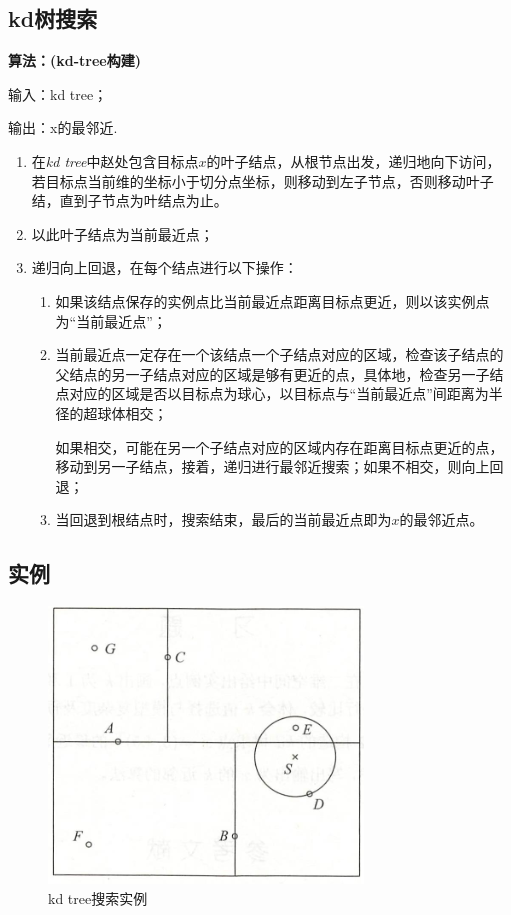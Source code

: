 \subsection*{kd树搜索}

\begin{framed}

    \textbf{算法：(kd-tree构建)}

    输入：kd tree；

    输出：x的最邻近.

    \begin{enumerate}[itemindent=2em]
        \item 在\textsl{kd tree}中赵处包含目标点$x$的叶子结点，从根节点出发，递归地向下访问，若目标点当前维的坐标小于切分点坐标，则移动到左子节点，否则移动叶子结，直到子节点为叶结点为止。
        
        \item 以此叶子结点为当前最近点；
        \item 递归向上回退，在每个结点进行以下操作：
        \begin{enumerate}
            \item 如果该结点保存的实例点比当前最近点距离目标点更近，则以该实例点为“当前最近点”；
            \item 当前最近点一定存在一个该结点一个子结点对应的区域，检查该子结点的父结点的另一子结点对应的区域是够有更近的点，具体地，检查另一子结点对应的区域是否以目标点为球心，以目标点与“当前最近点”间距离为半径的超球体相交；
            
            如果相交，可能在另一个子结点对应的区域内存在距离目标点更近的点，移动到另一子结点，接着，递归进行最邻近搜索；如果不相交，则向上回退；
            \item 当回退到根结点时，搜索结束，最后的当前最近点即为$x$的最邻近点。
        \end{enumerate}

    \end{enumerate}

\end{framed}

\subsection*{实例}

\begin{figure}[H]
    \centering
    \includegraphics[scale=0.5]{figures/kd-tree-ex.png}
    \caption{kd  tree搜索实例}
\end{figure}

